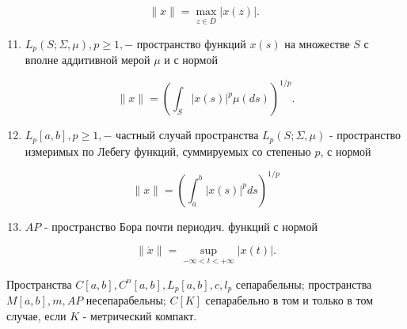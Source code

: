 \documentclass[10pt]{article}
\begin{document}
\[

\|x\|=\max _{z \in \bar{D}}|x(z)| \text {. }

\]



\begin{enumerate}

  \setcounter{enumi}{10}

  \item $L_{p}(S ; \Sigma, \mu), p \geqslant 1,-$ пространство функций $x(s)$ на множестве $S$ с вполне аддитивной мерой $\mu$ и с нормой

\end{enumerate}



\[

\|x\|=\left(\int_{S}|x(s)|^{p} \mu(d s)\right)^{1 / p} .

\]



\begin{enumerate}

  \setcounter{enumi}{11}

  \item $L_{p}[a, b], p \geqslant 1,-$ частный случай пространства $L_{p}(S ; \Sigma, \mu)$ - пространство измеримых по Лебегу функций, суммируемых со степенью $p$, с нормой

\end{enumerate}



\[

\|x\|=\left(\int_{a}^{b}|x(s)|^{p} d s\right)^{1 / p}

\]



\begin{enumerate}

  \setcounter{enumi}{12}

  \item $A P$ - пространство Бора почти периодич. функций с нормой

\end{enumerate}



\[

\|\dot{x}\|=\sup _{-\infty<t<+\infty}|x(t)| .

\]



Пространства $C[a, b], C^{n}[a, b], L_{p}[a, b], c, l_{p}$ сепарабельны; пространства $M[a, b], m, A P$ несепарабельны; $C[K]$ сепарабельно в том и только в том случае, если $K$ - метрический компакт.
\end{document}
